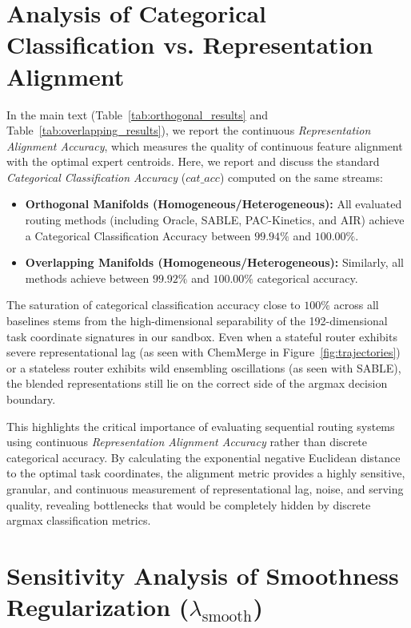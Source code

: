 \documentclass{article}
\theoremstyle{plain}
\theoremstyle{definition}
\theoremstyle{remark}
\begin{document}
\section{Analysis of Categorical Classification vs. Representation Alignment}
\label{app:metrics}

In the main text (Table~\ref{tab:orthogonal_results} and Table~\ref{tab:overlapping_results}), we report the continuous \emph{Representation Alignment Accuracy}, which measures the quality of continuous feature alignment with the optimal expert centroids. Here, we report and discuss the standard \emph{Categorical Classification Accuracy} ($cat\_acc$) computed on the same streams:
\begin{itemize}
    \item \textbf{Orthogonal Manifolds (Homogeneous/Heterogeneous):} All evaluated routing methods (including Oracle, SABLE, PAC-Kinetics, and AIR) achieve a Categorical Classification Accuracy between $99.94\%$ and $100.00\%$.
    \item \textbf{Overlapping Manifolds (Homogeneous/Heterogeneous):} Similarly, all methods achieve between $99.92\%$ and $100.00\%$ categorical accuracy.
\end{itemize}

The saturation of categorical classification accuracy close to $100\%$ across all baselines stems from the high-dimensional separability of the 192-dimensional task coordinate signatures in our sandbox. Even when a stateful router exhibits severe representational lag (as seen with ChemMerge in Figure~\ref{fig:trajectories}) or a stateless router exhibits wild ensembling oscillations (as seen with SABLE), the blended representations still lie on the correct side of the argmax decision boundary.

This highlights the critical importance of evaluating sequential routing systems using continuous \emph{Representation Alignment Accuracy} rather than discrete categorical accuracy. By calculating the exponential negative Euclidean distance to the optimal task coordinates, the alignment metric provides a highly sensitive, granular, and continuous measurement of representational lag, noise, and serving quality, revealing bottlenecks that would be completely hidden by discrete argmax classification metrics.

\section{Sensitivity Analysis of Smoothness Regularization ($\lambda_{\text{smooth}}$)}
\label{app:sensitivity}
\end{document}
